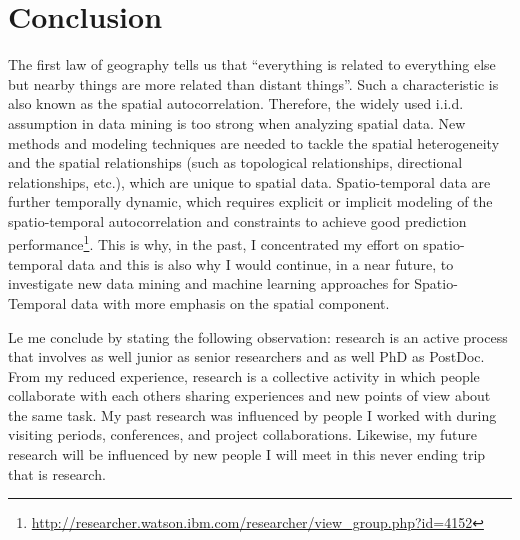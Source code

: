 \section{Conclusion}
The first law of geography tells us that “everything is related to everything else but nearby things are more related than distant things”. Such a characteristic is also known as the spatial autocorrelation. Therefore, the widely used i.i.d. assumption in data mining is too strong when analyzing spatial data. New methods and modeling techniques are needed to tackle the spatial heterogeneity and the spatial relationships (such as topological relationships, directional relationships, etc.), which are unique to spatial data. Spatio-temporal data are further temporally dynamic, which requires explicit or implicit modeling of the spatio-temporal autocorrelation and constraints to achieve good prediction performance\footnote{\url{http://researcher.watson.ibm.com/researcher/view_group.php?id=4152}}.
This is why, in the past, I concentrated my effort on spatio-temporal data and this is also why I would continue, in a near future, to investigate new data mining and machine learning approaches for Spatio-Temporal data with more emphasis on the spatial component.  %

Le me conclude by stating the following observation: research is an active process that involves as well junior as senior researchers and as well PhD as PostDoc. From my reduced experience, research is a collective activity in which people collaborate with each others sharing experiences and new points of view about the same task. My past research was influenced by  people I worked with during visiting periods, conferences, and project collaborations. Likewise, my future research will be influenced by new people I will meet in this never ending trip that is research.



